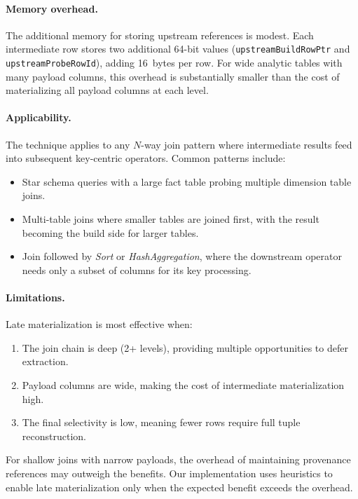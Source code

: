 \paragraph{Memory overhead.}
The additional memory for storing upstream references is modest.
Each intermediate row stores two additional 64-bit values (\texttt{upstreamBuildRowPtr} and \texttt{upstreamProbeRowId}), adding 16~bytes per row.
For wide analytic tables with many payload columns, this overhead is substantially smaller than the cost of materializing all payload columns at each level.

\paragraph{Applicability.}
The technique applies to any $N$-way join pattern where intermediate results feed into subsequent key-centric operators.
Common patterns include:
\begin{itemize}[leftmargin=*]
  \item Star schema queries with a large fact table probing multiple dimension table joins.
  \item Multi-table joins where smaller tables are joined first, with the result becoming the build side for larger tables.
  \item Join followed by \emph{Sort} or \emph{HashAggregation}, where the downstream operator needs only a subset of columns for its key processing.
\end{itemize}

\paragraph{Limitations.}
Late materialization is most effective when:
\begin{enumerate}[leftmargin=*]
  \item The join chain is deep (2+ levels), providing multiple opportunities to defer extraction.
  \item Payload columns are wide, making the cost of intermediate materialization high.
  \item The final selectivity is low, meaning fewer rows require full tuple reconstruction.
\end{enumerate}

For shallow joins with narrow payloads, the overhead of maintaining provenance references may outweigh the benefits.
Our implementation uses heuristics to enable late materialization only when the expected benefit exceeds the overhead.
